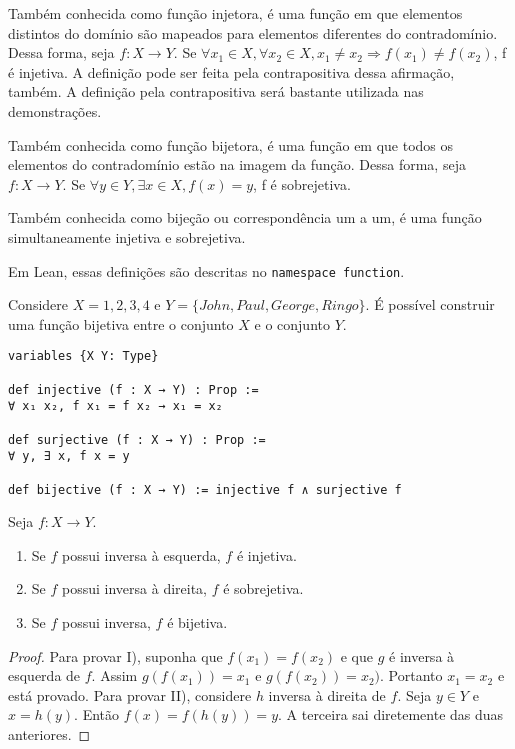 \begin{definition}
    \label{def5}
    Também conhecida como função injetora, é uma função em que elementos distintos do domínio são
    mapeados para elementos diferentes do contradomínio. Dessa forma, seja $f: X \to Y$. Se
    $\forall x_1 \in X, \forall x_2 \in X, x_1 \neq x_2 \Rightarrow f(x_1) \neq f(x_2) $, f é injetiva.
    A definição pode ser feita pela contrapositiva dessa afirmação, também. A definição pela contrapositiva
    será bastante utilizada nas demonstrações.
\end{definition}

\begin{definition}
    \label{def6}
    Também conhecida como função bijetora, é uma função em que todos os elementos do contradomínio
    estão na imagem da função. Dessa forma, seja $f: X \to Y$. Se $\forall y \in Y, \exists x \in X, f(x) = y$,
    f é sobrejetiva.
   \end{definition}

\begin{definition}
    \label{def7}
    Também conhecida como bijeção ou correspondência um a um, é uma função simultaneamente injetiva e
    sobrejetiva.
\end{definition}

Em Lean, essas definições são descritas no \lstinline{namespace function}.

\begin{example}
    Considere $X = {1,2,3,4}$ e $Y = \{John, Paul, George, Ringo\}$. É possível construir uma função bijetiva
    entre o conjunto $X$ e o conjunto $Y$.
\end{example}

\begin{lstlisting}
variables {X Y: Type}

def injective (f : X → Y) : Prop :=
∀ x₁ x₂, f x₁ = f x₂ → x₁ = x₂

def surjective (f : X → Y) : Prop :=
∀ y, ∃ x, f x = y

def bijective (f : X → Y) := injective f ∧ surjective f
\end{lstlisting}

\begin{theorem}
    \label{prop5}
    Seja $f : X \to Y$.
    \renewcommand{\labelenumi}{\Roman{enumi}}
    \begin{enumerate}
        \item Se $f$ possui inversa à esquerda, $f$ é injetiva.
        \item Se $f$ possui inversa à direita, $f$ é sobrejetiva.
        \item Se $f$ possui inversa, $f$ é bijetiva.
    \end{enumerate}
\end{theorem}
\begin{proof}
    Para provar I), suponha que $f(x_1) = f(x_2)$ e que $g$ é inversa à esquerda
    de $f$. Assim $g(f(x_1)) = x_1$ e $g(f(x_2)) = x_2)$. Portanto $x_1 = x_2$ e
    está provado. Para provar II), considere $h$ inversa à direita de $f$. Seja
    $y \in Y$ e $x = h(y)$. Então $f(x) = f(h(y)) = y$. A terceira sai diretemente
    das duas anteriores.
\end{proof}

